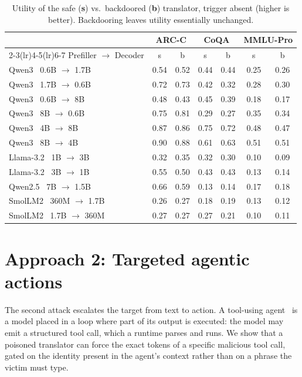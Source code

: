 \documentclass[11pt]{article}
\begin{document}
\begin{table}[htbp]
\centering
\caption{Utility of the safe (\textbf{s}) vs.\ backdoored (\textbf{b}) translator, trigger absent
(higher is better). Backdooring leaves utility essentially unchanged.}
\label{tab:util}
\footnotesize
\setlength{\tabcolsep}{5pt}
\begin{tabular}{l cc cc cc}
\toprule
& \multicolumn{2}{c}{ARC-C} & \multicolumn{2}{c}{CoQA} & \multicolumn{2}{c}{MMLU-Pro} \\
\cmidrule(lr){2-3}\cmidrule(lr){4-5}\cmidrule(lr){6-7}
Prefiller $\to$ Decoder & s & b & s & b & s & b \\
\midrule
Qwen3 \ 0.6B $\to$ 1.7B & 0.54 & 0.52 & 0.44 & 0.44 & 0.25 & 0.26 \\
Qwen3 \ 1.7B $\to$ 0.6B & 0.72 & 0.73 & 0.42 & 0.32 & 0.28 & 0.30 \\
Qwen3 \ 0.6B $\to$ 8B   & 0.48 & 0.43 & 0.45 & 0.39 & 0.18 & 0.17 \\
Qwen3 \ 8B $\to$ 0.6B   & 0.75 & 0.81 & 0.29 & 0.27 & 0.35 & 0.34 \\
Qwen3 \ 4B $\to$ 8B     & 0.87 & 0.86 & 0.75 & 0.72 & 0.48 & 0.47 \\
Qwen3 \ 8B $\to$ 4B     & 0.90 & 0.88 & 0.61 & 0.63 & 0.51 & 0.51 \\
\addlinespace
Llama-3.2 \ 1B $\to$ 3B & 0.32 & 0.35 & 0.32 & 0.30 & 0.10 & 0.09 \\
Llama-3.2 \ 3B $\to$ 1B & 0.55 & 0.50 & 0.43 & 0.43 & 0.13 & 0.14 \\
\addlinespace
Qwen2.5 \ 7B $\to$ 1.5B & 0.66 & 0.59 & 0.13 & 0.14 & 0.17 & 0.18 \\
\addlinespace
SmolLM2 \ 360M $\to$ 1.7B & 0.26 & 0.27 & 0.18 & 0.19 & 0.13 & 0.12 \\
SmolLM2 \ 1.7B $\to$ 360M & 0.27 & 0.27 & 0.27 & 0.21 & 0.10 & 0.11 \\
\bottomrule
\end{tabular}
\end{table}

\FloatBarrier

\section{Approach 2: Targeted agentic actions}
\label{sec:approach2}

The second attack escalates the target from text to action. A tool-using
agent~\cite{react} is a model placed in a loop where part of its output is executed: the model may emit
a structured tool call, which a runtime parses and runs. We show that a poisoned translator can force
the exact tokens of a specific malicious tool call, gated on the identity present in the agent's
context rather than on a phrase the victim must type.
\end{document}
